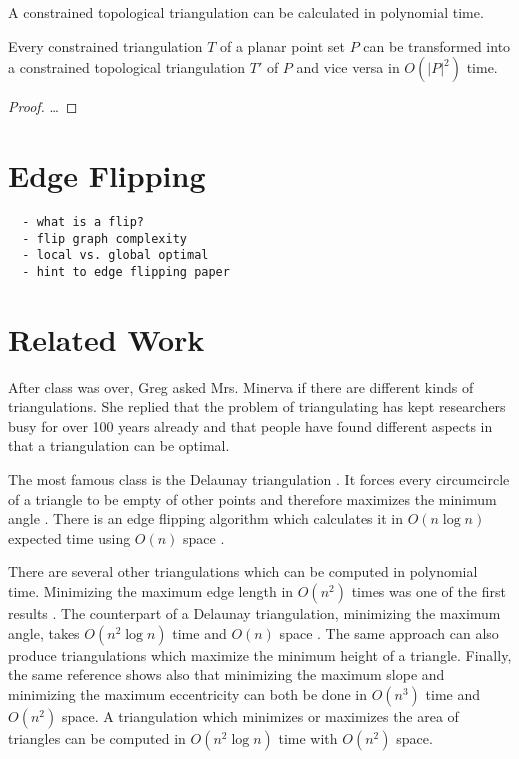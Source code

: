 \begin{theorem}
  A constrained topological triangulation can be calculated in polynomial time. 
\end{theorem}

\begin{theorem}
  Every constrained triangulation \(T\) of a planar point set \(P\) can be
  transformed into a constrained topological triangulation \(T'\) of \(P\)
  and vice versa in \(O(|P|^2)\) time.
\end{theorem}

\begin{proof}
  \ldots{}
\end{proof}


\section{Edge Flipping}
\begin{verbatim}
  - what is a flip?
  - flip graph complexity
  - local vs. global optimal
  - hint to edge flipping paper
\end{verbatim}

\section{Related Work}
After class was over, Greg asked Mrs. Minerva if there are different
kinds of triangulations. She replied that the problem of 
triangulating has kept researchers busy for over 100 years already
\cite{triangulation_hilbert} and that people have found different
aspects in that a triangulation can be optimal.

The most famous class is the Delaunay triangulation
\cite[Section 9.2]{deberg_compgeom}. It forces every circumcircle
of a triangle to be empty of other points and therefore maximizes
the minimum angle \cite[Theorem 9.9]{deberg_compgeom}. There is an
edge flipping algorithm which calculates it in \(O(n \log n)\) 
expected time using \(O(n)\) space 
\cite[Theorem 9.12]{deberg_compgeom}.

There are several other triangulations which can be computed in
polynomial time. Minimizing the maximum edge length in \(O(n^2)\)
times was one of the first results \cite{triangulation_minmax_length}.
The counterpart of a Delaunay triangulation, 
minimizing the maximum angle, takes \(O(n^2 \log n)\) time and
\(O(n)\) space \cite{triangulation_edge_insertion}. The same
approach can also produce triangulations which maximize the minimum 
height of a triangle. Finally, the same reference shows also that 
minimizing the maximum slope and minimizing the maximum eccentricity 
can both be done in \(O(n^3)\) time and \(O(n^2)\) space. A 
triangulation which minimizes or maximizes the area of triangles can
be computed in \(O(n^2 \log n)\) time with \(O(n^2)\) space.
\cite{triangulation_area}

